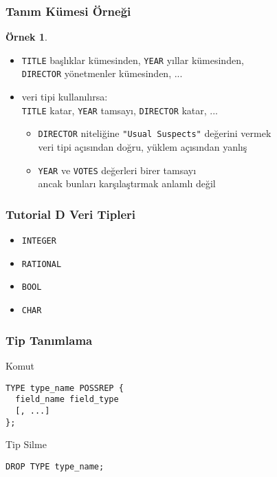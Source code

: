 \documentclass[dvipsnames]{beamer}
\theoremstyle{definition}
\theoremstyle{example}
\newtheorem{ornek}[theorem]{Örnek}
\theoremstyle{plain}
\begin{document}
\begin{frame}
  \frametitle{Tanım Kümesi Örneği}

  \begin{ornek}
    \begin{itemize}
      \item \texttt{TITLE} başlıklar kümesinden, \texttt{YEAR} yıllar
        kümesinden,\\
        \texttt{DIRECTOR} yönetmenler kümesinden, ...

      \pause
      \item veri tipi kullanılırsa:\\
        \texttt{TITLE} katar, \texttt{YEAR} tamsayı, \texttt{DIRECTOR} katar,
          ...

      \begin{itemize}
        \item \texttt{DIRECTOR} niteliğine \texttt{"Usual Suspects"} değerini
          vermek\\
          veri tipi açısından doğru, yüklem açısından yanlış

        \item \texttt{YEAR} ve \texttt{VOTES} değerleri birer tamsayı\\
          ancak bunları karşılaştırmak anlamlı değil
      \end{itemize}
    \end{itemize}
  \end{ornek}
\end{frame}

\begin{frame}
  \frametitle{Tutorial D Veri Tipleri}

  \begin{itemize}
    \item \texttt{INTEGER}
    \item \texttt{RATIONAL}
    \item \texttt{BOOL}
    \item \texttt{CHAR}
  \end{itemize}
\end{frame}

\begin{frame}[fragile]
  \frametitle{Tip Tanımlama}

  \begin{block}{Komut}
    \begin{lstlisting}
TYPE type_name POSSREP {
  field_name field_type
  [, ...]
};
    \end{lstlisting}
  \end{block}

  \pause
  \begin{block}{Tip Silme}
    \begin{lstlisting}
DROP TYPE type_name;
    \end{lstlisting}
  \end{block}
\end{frame}
\end{document}
